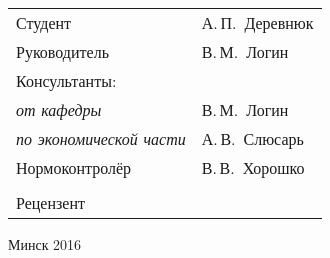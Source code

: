 \begin{titlepage}
\begin{center}
    \begin{tabular}{ p{}p{} }
      Студент & А.\,П.~Деревнюк \\
      Руководитель & В.\,М.~Логин \\
      Консультанты: &\\
      \hspace*{3ex}\emph{от кафедры} & В.\,М.~Логин \\
      \hspace*{3ex}\emph{по экономической части} & А.\,В.~Слюсарь \\
      Нормоконтролёр & В.\,В.~Хорошко \\
      & \\
      Рецензент &
    \end{tabular}

    \vfill
    {\normalsize Минск 2016}
  \end{center}
\end{titlepage}
